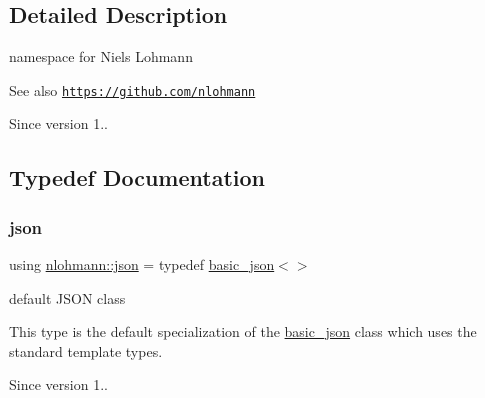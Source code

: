 \subsection{Detailed Description}
namespace for Niels Lohmann 

\begin{DoxySeeAlso}{See also}
\href{https://github.com/nlohmann}{\tt https\+://github.\+com/nlohmann} 
\end{DoxySeeAlso}
\begin{DoxySince}{Since}
version 1.. 
\end{DoxySince}


\subsection{Typedef Documentation}
\mbox{\label{namespacenlohmann_a2bfd99e845a2e5cd90aeaf1b1431f474}} 
\subsubsection{\texorpdfstring{json}{json}}
{\footnotesize\ttfamily using \hyperlink{namespacenlohmann_a2bfd99e845a2e5cd90aeaf1b1431f474}{nlohmann\+::json} = typedef \hyperlink{classnlohmann_1_1basic__json}{basic\+\_\+json}$<$$>$}



default J\+S\+ON class 

This type is the default specialization of the \hyperlink{classnlohmann_1_1basic__json}{basic\+\_\+json} class which uses the standard template types.

\begin{DoxySince}{Since}
version 1.. 
\end{DoxySince}

